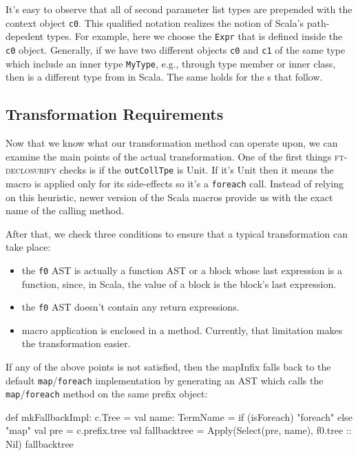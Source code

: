 It's easy to observe that all of second parameter list types are prepended
with the context object \texttt{c0}. This qualified notation realizes the notion of
Scala's path-depedent types. For example, here we choose the \texttt{Expr} that is
defined inside the \texttt{c0} object. Generally, if we have two different objects \texttt{c0} and
\texttt{c1} of the same type which include an inner type \texttt{MyType}, e.g., through type
member or inner class,  then  is a different type from  in
Scala. The same holds for the s that follow.


\subsection{Transformation Requirements}

Now that we know what our transformation method can operate upon, we can examine the
main points of the actual transformation. One of the first things \textsc{ft-declosurify}
checks is if the \texttt{outCollTpe} is Unit. If it's Unit then
it means the macro is applied only for its side-effects so it's a \texttt{foreach} call.
Instead of relying on this heuristic, newer version of the Scala macros provide
us with the exact name of the calling method.

After that, we check three conditions to ensure that a typical
transformation can take place:
\begin{itemize}
 \item
  the \texttt{f0} AST is actually a function AST or a block whose last
expression is a function, since, in Scala, the value of a block is the block's
last expression.
 \item
    the \texttt{f0} AST doesn't contain any return expressions.
 \item
    macro application is enclosed in a method. Currently, that limitation makes
the transformation easier.
\end{itemize}

If any of the above points is not satisfied, then the mapInfix falls back to the
default \texttt{map}/\texttt{foreach} implementation by generating an AST which
calls the \texttt{map}/\texttt{foreach} method on the same prefix object:

\begin{scalaCode}
def mkFallbackImpl: c.Tree = {
  val name: TermName = if (isForeach) "foreach" else "map"
  val pre = c.prefix.tree
  val fallbacktree = Apply(Select(pre, name), f0.tree :: Nil)
  fallbacktree
}
\end{scalaCode}


